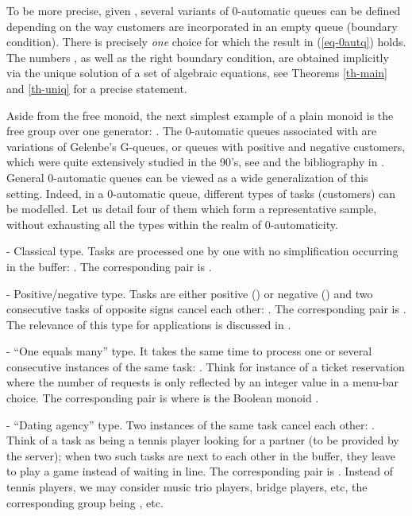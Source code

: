 \documentclass[11pt,a4paper]{article}
\theoremstyle{remark}
\def\eref#1{(\ref{#1})}
\begin{document}
To be more precise, given , several variants of 0-automatic
queues can be defined depending on the way customers are incorporated
in an empty queue (boundary condition). There is
precisely {\em one} choice for
which the result in \eref{eq-0autq} holds. The numbers , as well as the right boundary condition,
are obtained implicitly via the unique
solution of a set of algebraic equations, see Theorems
\ref{th-main} and \ref{th-uniq} for a precise statement.

\medskip

Aside from the free monoid, the next simplest example of a
plain monoid is the free group over one generator:
. The 0-automatic queues associated with  
are variations of Gelenbe's
G-queues, or queues with positive and negative customers, which
were quite extensively studied in the 90's, see \cite{gele91,FGSu}
and the bibliography in \cite{GePu}. General 0-automatic queues
can be viewed as a wide generalization of this setting. 
Indeed, in a 0-automatic queue, different types of tasks (customers) can
be modelled. Let us detail four of them which form a
representative sample, without exhausting all the types within the
realm of 0-automaticity.

\medskip

- Classical type. Tasks are processed one by one with no
  simplification occurring in the buffer: . The corresponding
  pair is .

\medskip

- Positive/negative type. Tasks are either positive () or
negative
  () and two consecutive tasks of opposite signs cancel each
  other: . The corresponding pair is
  .  The relevance of this type
  for applications is discussed in \cite{GePu}.

\medskip

- ``One equals many'' type. It takes the same time to process one
or
  several consecutive instances of the same task: . Think for instance of a ticket
  reservation where the number of requests is only reflected by
  an integer value in a menu-bar choice. The corresponding pair is
   where  is the Boolean monoid .

\medskip

- ``Dating agency'' type. Two instances of the same task cancel
each
  other: . Think of a task as being a tennis player looking for
  a partner (to be provided by the server); when two such tasks
  are next to each other in the buffer, they leave to play a
  game instead of waiting in line. The corresponding pair is
  . Instead of tennis players, we may
  consider music trio players, bridge players, etc, the corresponding
  group being , etc.
\end{document}
